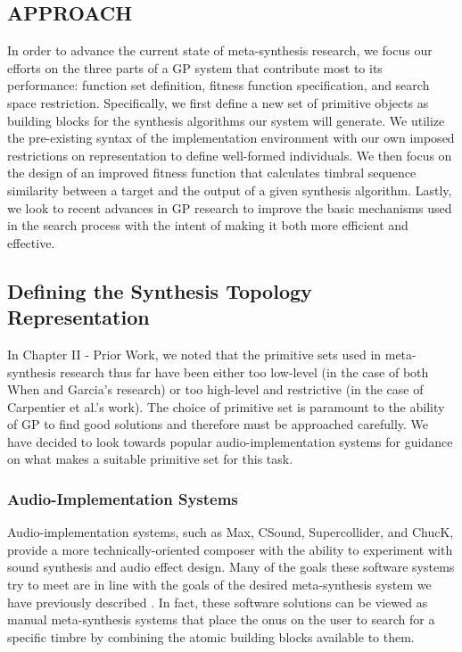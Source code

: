 \documentclass[12pt]{report} 	%
\numberwithin{figure}{chapter}
\numberwithin{table}{chapter}
\numberwithin{equation}{chapter}
\begin{document}
\begin{flushleft}
\vspace*{\QuarterPage}
\chapter{APPROACH} %
In order to advance the current state of meta-synthesis research, we focus our efforts on the three parts of a GP system that contribute most to its performance: function set definition, fitness function specification, and search space restriction. Specifically, we first define a new set of primitive objects as building blocks for the synthesis algorithms our system will generate. We utilize the pre-existing syntax of the implementation environment with our own imposed restrictions on representation to define well-formed individuals. We then focus on the design of an improved fitness function that calculates timbral sequence similarity between a target and the output of a given synthesis algorithm. Lastly, we look to recent advances in GP research to improve the basic mechanisms used in the search process with the intent of making it both more efficient and effective.

\section{Defining the Synthesis Topology Representation}
In Chapter II - Prior Work, we noted that the primitive sets used in meta-synthesis research thus far have been either too low-level (in the case of both When and Garcia's research) or too high-level and restrictive (in the case of Carpentier et al.'s work). The choice of primitive set is paramount to the ability of GP to find good solutions and therefore must be approached carefully. We have decided to look towards popular audio-implementation systems for guidance on what makes a suitable primitive set for this task.

\subsection{Audio-Implementation Systems}

Audio-implementation systems, such as Max, CSound, Supercollider, and ChucK, provide a more technically-oriented composer with the ability to experiment with sound synthesis and audio effect design. Many of the goals these software systems try to meet are in line with the goals of the desired meta-synthesis system we have previously described \cite{Moreno:2005bs}. In fact, these software solutions can be viewed as manual meta-synthesis systems that place the onus on the user to search for a specific timbre by combining the atomic building blocks available to them. 


\end{flushleft}
\end{document}
